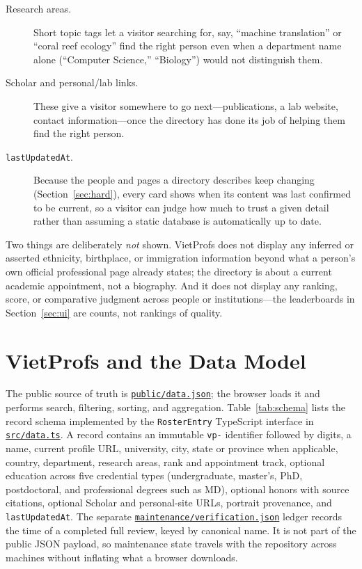 \documentclass[11pt]{article}
\newcommand{\code}[1]{\texttt{\small #1}}
\newcommand{\ghrepo}{https://github.com/dynaroars/vietprofs}
\newcommand{\codelink}[1]{\href{\ghrepo/blob/main/#1}{\code{#1}}}
\begin{document}
\begin{description}
\item[Research areas.] Short topic tags let a visitor searching for, say, ``machine translation'' or ``coral reef ecology'' find the right person even when a department name alone (``Computer Science,'' ``Biology'') would not distinguish them.
\item[Scholar and personal/lab links.] These give a visitor somewhere to go next---publications, a lab website, contact information---once the directory has done its job of helping them find the right person.
\item[\code{lastUpdatedAt}.] Because the people and pages a directory describes keep changing (Section~\ref{sec:hard}), every card shows when its content was last confirmed to be current, so a visitor can judge how much to trust a given detail rather than assuming a static database is automatically up to date.
\end{description}

Two things are deliberately \emph{not} shown.
VietProfs does not display any inferred or asserted ethnicity, birthplace, or immigration information beyond what a person's own official professional page already states; the directory is about a current academic appointment, not a biography.
And it does not display any ranking, score, or comparative judgment across people or institutions---the leaderboards in Section~\ref{sec:ui} are counts, not rankings of quality.

\section{VietProfs and the Data Model}
\label{sec:model}
The public source of truth is \codelink{public/data.json}; the browser loads it and performs search, filtering, sorting, and aggregation.
Table~\ref{tab:schema} lists the record schema implemented by the \code{RosterEntry} TypeScript interface in \codelink{src/data.ts}.
A record contains an immutable \code{vp-} identifier followed by digits, a name, current profile URL, university, city, state or province when applicable, country, department, research areas, rank and appointment track, optional education across five credential types (undergraduate, master's, PhD, postdoctoral, and professional degrees such as MD), optional honors with source citations, optional Scholar and personal-site URLs, portrait provenance, and \code{lastUpdatedAt}.
The separate \codelink{maintenance/verification.json} ledger records the time of a completed full review, keyed by canonical name. It is not part of the public JSON payload, so maintenance state travels with the repository across machines without inflating what a browser downloads.
\end{document}
